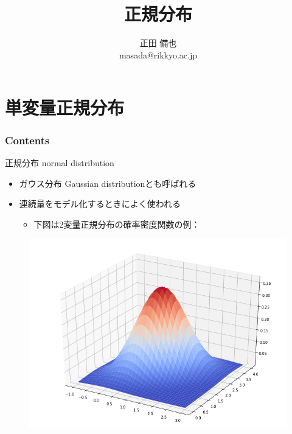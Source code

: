 \documentclass[aspectratio=169,unicode,dvipdfmx,14pt]{beamer}
\title{\ \\正規分布}
\author{正田 備也\\{\small masada@rikkyo.ac.jp}}
\date{}
\begin{document}
\begin{frame}
\titlepage
\end{frame}

\section{単変量正規分布}

\begin{frame}\frametitle{Contents}
\Large \tableofcontents[currentsection]
\end{frame}

\begin{frame}{正規分布 normal distribution}
\begin{itemize}
\item ガウス分布 Gaussian distributionとも呼ばれる
\item 連続量をモデル化するときによく使われる
\begin{itemize}
\item 下図は2変量正規分布の確率密度関数の例：
\end{itemize}
\end{itemize}
\begin{figure}
\center
\includegraphics[scale=0.3]{normal_distribution_1.png}
\end{figure}
\end{frame}
\end{document}
